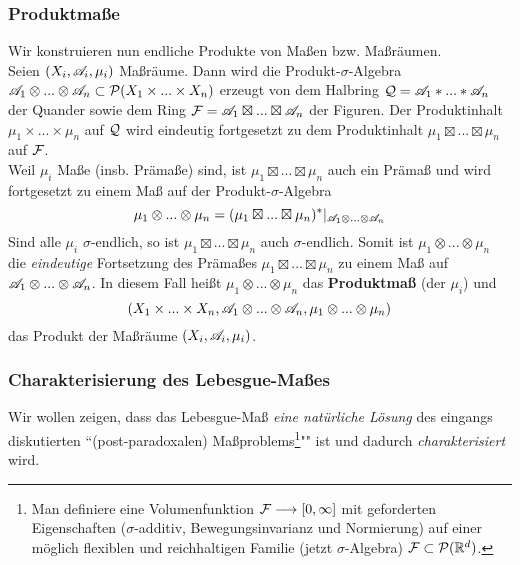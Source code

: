 \subsubsection{Produktmaße}
Wir konstruieren nun endliche Produkte von Maßen bzw. Maßräumen.
\vspace{0.5pc}
\\Seien $(X_i,\AA_i,\mu_i)$ Maßräume. Dann wird die Produkt-$\sigma$-Algebra $\AA_1 \otimes ... \otimes \AA_n \subset \PP(X_1\times ... \times X_n)$ erzeugt von dem Halbring $\QQ =\AA_1 \ast ... \ast \AA_n$ der Quander sowie dem Ring $\FF=\AA_1 \boxtimes ... \boxtimes \AA_n$ der Figuren. Der Produktinhalt $\mu_1 \times ... \times \mu_n$ auf $\QQ$ wird eindeutig fortgesetzt zu dem Produktinhalt $\mu_1 \boxtimes ... \boxtimes \mu_n$ auf $\FF$.
\vspace{0.5pc}
\\ Weil $\mu_i$ Maße (insb. Prämaße) sind, ist $\mu_1 \boxtimes ... \boxtimes \mu_n$ auch ein Prämaß und wird fortgesetzt zu einem Maß auf der Produkt-$\sigma$-Algebra
$$
\mu_1 \otimes ... \otimes \mu_n =  (\mu_1 \boxtimes ... \boxtimes \mu_n)^*|_{\AA_1 \otimes ... \otimes \AA_n}
$$
Sind alle $\mu_i$ $\sigma$-endlich, so ist $\mu_1 \boxtimes ... \boxtimes \mu_n$ auch $\sigma$-endlich. Somit ist $\mu_1 \otimes ... \otimes \mu_n $ die \emph{eindeutige} Fortsetzung des Prämaßes $\mu_1 \boxtimes ... \boxtimes \mu_n$ zu einem Maß auf $\AA_1 \otimes ... \otimes \AA_n$. In diesem Fall heißt $\mu_1 \otimes ... \otimes \mu_n$ das \textbf{Produktmaß} (der $\mu_i$) und 
$$
(X_1 \times ... \times X_n, \AA_1 \otimes ... \otimes \AA_n, \mu_1 \otimes ... \otimes \mu_n)
$$
das Produkt der Maßräume $(X_i,\AA_i,\mu_i)$.


\subsubsection{Charakterisierung des Lebesgue-Maßes}
Wir wollen zeigen, dass das Lebesgue-Maß \emph{eine natürliche Lösung} des eingangs diskutierten ``(post-paradoxalen) Maßproblems\footnote{Man definiere eine Volumenfunktion $\FF \longrightarrow [0,\infty]$ mit geforderten Eigenschaften ($\sigma$-additiv, Bewegungsinvarianz und Normierung) auf einer möglich flexiblen und reichhaltigen Familie (jetzt $\sigma$-Algebra) $\FF\subset \PP(\R^d)$.}"" ist und dadurch \emph{charakterisiert} wird.

